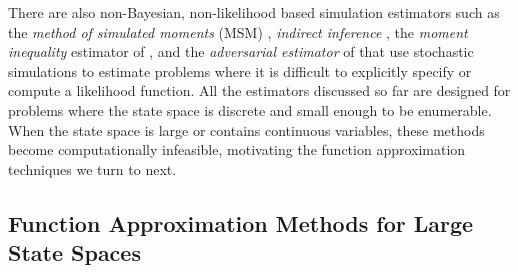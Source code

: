There are also non-Bayesian, non-likelihood based  simulation estimators such as the {\it method of simulated moments\/}
(MSM) \citet{msm:1989}, {\it indirect inference\/} \citet{ii:1993},  the {\it moment inequality\/} estimator of
\citet{bbl:2007}, and the {\it adversarial estimator\/} of \citet{kaji:2023} 
that use stochastic simulations to  estimate problems where it is difficult to explicitly specify or compute a likelihood function. 
All the estimators discussed so far are designed for problems where the state space is discrete and small enough to be enumerable. When the state space is large or contains continuous variables, these methods become computationally infeasible, motivating the function approximation techniques we turn to next.

\subsection{Function Approximation Methods for Large State Spaces}

